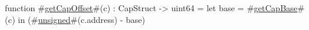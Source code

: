 function #\hyperref[zgetCapOffset]{getCapOffset}#(c) : CapStruct -> uint64 = 
    let base = #\hyperref[zgetCapBase]{getCapBase}#(c) in
    (#\hyperref[zunsigned]{unsigned}#(c.address) - base) %
